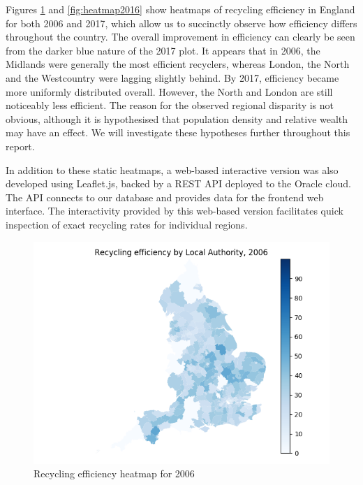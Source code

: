 \documentclass[11pt,conference]{IEEEtran}
\begin{document}
Figures \ref{fig:heatmap2006} and \ref{fig:heatmap2016} show heatmaps of recycling efficiency in England for both 2006 and 2017, which allow us to succinctly observe how efficiency differs throughout the country. The overall improvement in efficiency can clearly be seen from the darker blue nature of the 2017 plot. It appears that in 2006, the Midlands were generally the most efficient recyclers, whereas London, the North and the Westcountry were lagging slightly behind. By 2017, efficiency became more uniformly distributed overall. However, the North and London are still noticeably less efficient. The reason for the observed regional disparity is not obvious, although it is hypothesised that population density and relative wealth may have an effect. We will investigate these hypotheses further throughout this report.

In addition to these static heatmaps, a web-based interactive version was also developed using Leaflet.js, backed by a REST API deployed to the Oracle cloud. The API connects to our database and provides data for the frontend web interface. The interactivity provided by this web-based version facilitates quick inspection of exact recycling rates for individual regions.

\begin{figure}
    \centering
    \includegraphics[width=\linewidth]{../figures/england_recycling_heatmap_efficiency2006.png}
    \caption{Recycling efficiency heatmap for 2006}
    \label{fig:heatmap2006}
\end{figure}
\end{document}
